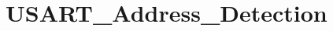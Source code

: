 \hypertarget{group___u_s_a_r_t___address___detection}{\section{U\-S\-A\-R\-T\-\_\-\-Address\-\_\-\-Detection}
\label{group___u_s_a_r_t___address___detection}
}

